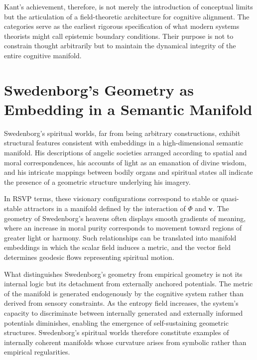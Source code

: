 \documentclass[12pt]{article}
\begin{document}
Kant’s achievement, therefore, is not merely the introduction of conceptual 
limits but the articulation of a field-theoretic architecture for cognitive 
alignment. The categories serve as the earliest rigorous specification of what 
modern systems theorists might call epistemic boundary conditions. Their 
purpose is not to constrain thought arbitrarily but to maintain the 
dynamical integrity of the entire cognitive manifold.

\section{Swedenborg’s Geometry as Embedding in a Semantic Manifold}

Swedenborg’s spiritual worlds, far from being arbitrary constructions, exhibit 
structural features consistent with embeddings in a high-dimensional semantic 
manifold. His descriptions of angelic societies arranged according to spatial 
and moral correspondences, his accounts of light as an emanation of divine 
wisdom, and his intricate mappings between bodily organs and spiritual states 
all indicate the presence of a geometric structure underlying his imagery. 

In RSVP terms, these visionary configurations correspond to stable or 
quasi-stable attractors in a manifold defined by the interaction of 
$\Phi$ and $\mathbf{v}$. The geometry of Swedenborg’s heavens often displays 
smooth gradients of meaning, where an increase in moral purity corresponds to 
movement toward regions of greater light or harmony. Such relationships can be 
translated into manifold embeddings in which the scalar field induces a metric, 
and the vector field determines geodesic flows representing spiritual motion. 

What distinguishes Swedenborg’s geometry from empirical geometry is not its 
internal logic but its detachment from externally anchored potentials. The 
metric of the manifold is generated endogenously by the cognitive system 
rather than derived from sensory constraints. As the entropy field increases, 
the system’s capacity to discriminate between internally generated and 
externally informed potentials diminishes, enabling the emergence of 
self-sustaining geometric structures. Swedenborg’s spiritual worlds therefore 
constitute examples of internally coherent manifolds whose curvature arises 
from symbolic rather than empirical regularities. 
\end{document}
